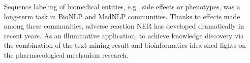 Sequence labeling of biomedical entities, e.g., side effects or phenotypes, was a long-term task in BioNLP and MedNLP communities. Thanks to effects made among these communities, adverse reaction NER has developed dramatically in recent years. As an illuminative application, to achieve knowledge discovery via the combination of the text mining result and bioinformatics idea shed lights on the pharmacological mechanism research.

